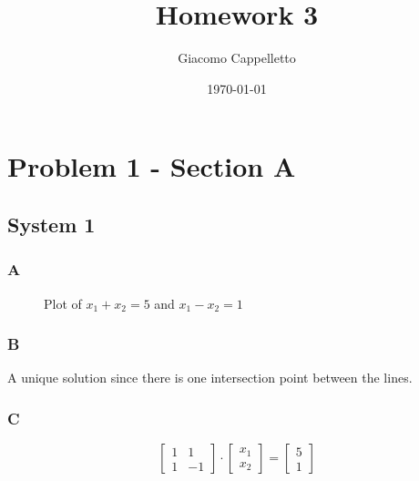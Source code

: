 \documentclass{article}
\title{Homework 3}
\author{Giacomo Cappelletto}
\date{\today}
\begin{document}
\maketitle

\section*{Problem 1 - Section A}

\subsection*{System 1}

\subsubsection*{A}
\begin{figure}[h!]
	\centering
	\caption{Plot of $x_1 + x_2 = 5$ and $x_1 - x_2 = 1$}
	\label{fig:plot1}
\end{figure}

\subsubsection*{B}

A unique solution since there is one intersection point between the lines.

\subsubsection*{C}

\[
	\begin{bmatrix}
		1 & 1  \\
		1 & -1
	\end{bmatrix}
	\cdot
	\begin{bmatrix}
		x_1 \\
		x_2
	\end{bmatrix}
	=
	\begin{bmatrix}
		5 \\
		1
	\end{bmatrix}
\]
\end{document}
